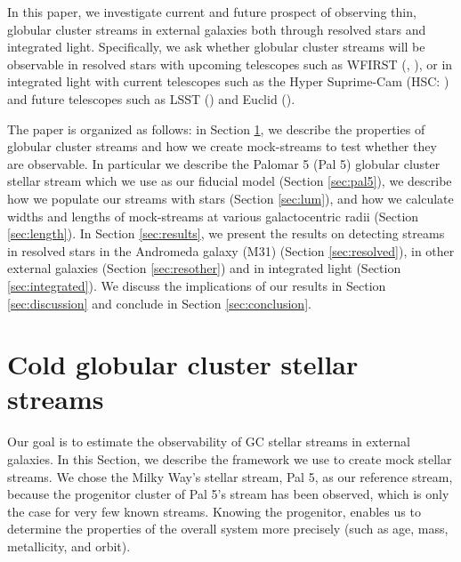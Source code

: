 \documentclass[twocolumn]{aastex62}
\begin{document}
In this paper, we investigate current and future prospect of observing thin, globular cluster streams in external galaxies both through resolved stars and integrated light. 
Specifically, we ask whether globular cluster streams will be observable in resolved stars with upcoming telescopes such as WFIRST (\citealt{spergel13}, \citealt{spergel15}), or in integrated light with current telescopes such as the Hyper Suprime-Cam (HSC: \citealt{miyazaki12}) and future telescopes such as LSST (\citealt{ivezi08}) and Euclid (\citealt{racca16}). %

The paper is organized as follows: in Section \ref{sec:coldstreams}, we describe the properties of globular cluster streams and how we create mock-streams to test whether they are observable. In particular we describe the Palomar 5 (Pal 5) globular cluster stellar stream which we use as our fiducial model (Section \ref{sec:pal5}), we describe how we populate our streams with stars (Section \ref{sec:lum}), and how we calculate widths and lengths of mock-streams at various galactocentric radii (Section \ref{sec:length}). In Section \ref{sec:results}, we present the results on detecting streams in resolved stars in the Andromeda galaxy (M31) (Section \ref{sec:resolved}), in other external galaxies (Section \ref{sec:resother}) and in integrated light (Section \ref{sec:integrated}). We discuss the implications of our results in Section \ref{sec:discussion} and conclude in Section \ref{sec:conclusion}.


\section{Cold globular cluster stellar streams}
\label{sec:coldstreams}
Our goal is to estimate the observability of GC stellar streams in external galaxies. In this Section, we describe the framework we use to create mock stellar streams.  We chose the Milky Way's stellar stream, Pal 5,  as our reference stream, because the progenitor cluster of Pal 5's stream has been observed, which is only the case for very few known streams. Knowing the progenitor, enables us to determine the properties of the overall system more precisely (such as age, mass, metallicity, and orbit). 
\end{document}
